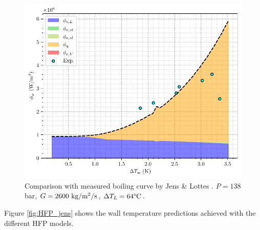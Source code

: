 \npar

\begin{figure}[!h]
\centering
\includegraphics[width=0.6\linewidth]{img/HFP/jens/jens_p138.pdf}
\caption{Comparison with measured boiling curve by Jens \& Lottes \cite{jens_analysis_1951}. $P=138$ bar, $G=2600~\text{kg/m$^{2}$/s}$, $\Delta T_{L}=64\degree\mathrm{C}$.}
\label{fig:HFP_jens_BC}
\end{figure}
\npar

Figure \ref{fig:HFP_jens} shows the wall temperature predictions achieved with the different HFP models.

